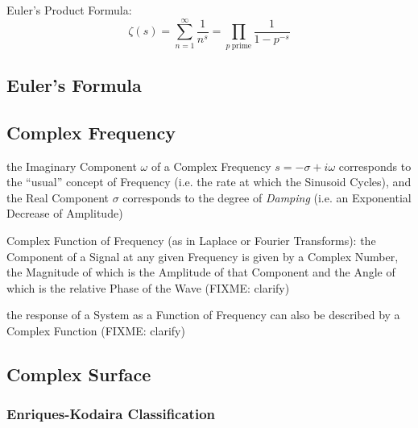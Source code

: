 Euler's Product Formula:
\[
  \zeta(s) = \sum_{n=1}^\infty \frac{1}{n^s}
    = \prod_{p\ \text{prime}} \frac{1}{1 - p^{-s}}
\]



\subsection{Euler's Formula}\label{sec:eulers_formula}

\subsection{Complex Frequency}\label{sec:complex_frequency}

the Imaginary Component $\omega$ of a Complex Frequency $s = -\sigma + i\omega$
corresponds to the ``usual'' concept of Frequency (i.e. the rate at which the
Sinusoid Cycles), and the Real Component $\sigma$ corresponds to the degree of
\emph{Damping} (i.e. an Exponential Decrease of Amplitude)

Complex Function of Frequency (as in Laplace or Fourier Transforms): the
Component of a Signal at any given Frequency is given by a Complex Number, the
Magnitude of which is the Amplitude of that Component and the Angle of which is
the relative Phase of the Wave (FIXME: clarify)

the response of a System as a Function of Frequency can also be described by a
Complex Function (FIXME: clarify)



\subsection{Complex Surface}\label{sec:complex_surface}

\subsubsection{Enriques-Kodaira Classification}
\label{sec:enriques_kodaira}

